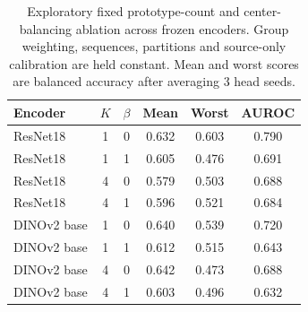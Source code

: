\begin{table}[t]
\centering\small
\begin{tabular}{lccccc}
\hline
Encoder & $K$ & $\beta$ & Mean & Worst & AUROC \\
\hline
ResNet18 & 1 & 0 & 0.632 & 0.603 & 0.790 \\
ResNet18 & 1 & 1 & 0.605 & 0.476 & 0.691 \\
ResNet18 & 4 & 0 & 0.579 & 0.503 & 0.688 \\
ResNet18 & 4 & 1 & 0.596 & 0.521 & 0.684 \\
DINOv2 base & 1 & 0 & 0.640 & 0.539 & 0.720 \\
DINOv2 base & 1 & 1 & 0.612 & 0.515 & 0.643 \\
DINOv2 base & 4 & 0 & 0.642 & 0.473 & 0.688 \\
DINOv2 base & 4 & 1 & 0.603 & 0.496 & 0.632 \\
\hline\end{tabular}
\caption{Exploratory fixed prototype-count and center-balancing ablation across frozen encoders. Group weighting, sequences, partitions and source-only calibration are held constant. Mean and worst scores are balanced accuracy after averaging 3 head seeds.}
\label{tab:encoder_factorial}
\end{table}
